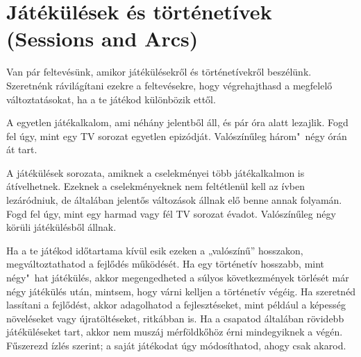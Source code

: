 \section[Játékülések és történetívek]{Játékülések és történetívek (Sessions and Arcs)}

Van pár feltevésünk, amikor játékülésekről és történetívekről beszélünk. Szeretnénk rávilágítani ezekre a feltevésekre, hogy végrehajthasd a megfelelő változtatásokat, ha a te játékod különbözik ettől.

A  egyetlen játékalkalom, ami néhány jelentből áll, és pár óra alatt lezajlik. Fogd fel úgy, mint egy TV sorozat egyetlen epizódját. Valószínűleg három"~négy órán át tart.

A  játékülések sorozata, amiknek a cselekményei több játékalkalmon is átívelhetnek. Ezeknek a cselekményeknek nem feltétlenül kell az ívben lezáródniuk, de általában jelentős változások állnak elő benne annak folyamán. Fogd fel úgy, mint egy harmad vagy fél TV sorozat évadot. Valószínűleg négy körüli játékülésből állnak.

Ha a te játékod időtartama kívül esik ezeken a „valószínű” hosszakon, megváltoztathatod a fejlődés működését.  Ha egy történetív hosszabb, mint négy"~hat játékülés, akkor megengedheted a súlyos következmények törlését már négy játékülés után, mintsem, hogy várni kelljen a történetív végéig. Ha szeretnéd lassítani a fejlődést, akkor adagolhatod a fejlesztéseket, mint például a képesség növeléseket vagy újratöltéseket, ritkábban is. Ha a csapatod általában rövidebb játéküléseket tart, akkor nem muszáj mérföldkőhöz érni mindegyiknek a végén. Fűszerezd ízlés szerint; a saját játékodat úgy módosíthatod, ahogy csak akarod.
